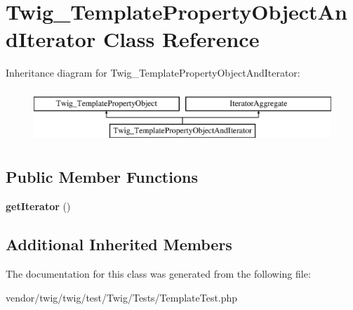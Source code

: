 \hypertarget{classTwig__TemplatePropertyObjectAndIterator}{}\section{Twig\+\_\+\+Template\+Property\+Object\+And\+Iterator Class Reference}
\label{classTwig__TemplatePropertyObjectAndIterator}
Inheritance diagram for Twig\+\_\+\+Template\+Property\+Object\+And\+Iterator\+:\begin{figure}[H]
\begin{center}
\leavevmode
\includegraphics[height=2.000000cm]{classTwig__TemplatePropertyObjectAndIterator}
\end{center}
\end{figure}
\subsection*{Public Member Functions}
\begin{DoxyCompactItemize}
\item 
{\bfseries get\+Iterator} ()\hypertarget{classTwig__TemplatePropertyObjectAndIterator_ad8bb297270f07ffe4598026ffac13c51}{}\label{classTwig__TemplatePropertyObjectAndIterator_ad8bb297270f07ffe4598026ffac13c51}

\end{DoxyCompactItemize}
\subsection*{Additional Inherited Members}


The documentation for this class was generated from the following file\+:\begin{DoxyCompactItemize}
\item 
vendor/twig/twig/test/\+Twig/\+Tests/Template\+Test.\+php\end{DoxyCompactItemize}
